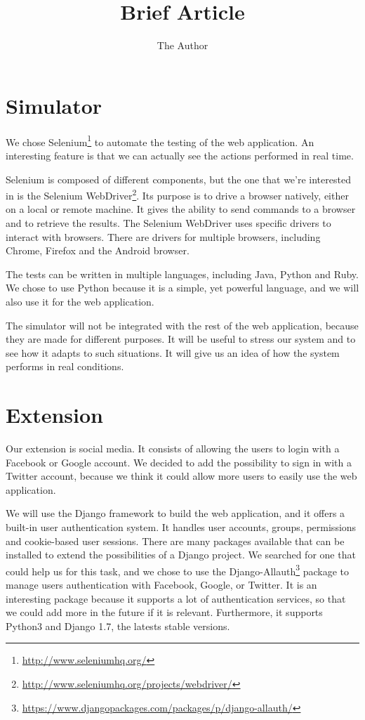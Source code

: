 \documentclass[11pt, a4paper]{article}   	%
\title{Brief Article}
\author{The Author}
\begin{document}

\section{Simulator}

We chose Selenium\footnote{\url{http://www.seleniumhq.org/}} to automate the testing of the web application.
An interesting feature is that we can actually see the actions performed in real time.

Selenium is composed of different components, but the one that we're interested in is the Selenium WebDriver\footnote{\url{http://www.seleniumhq.org/projects/webdriver/}}. %
Its purpose is to drive a browser natively, either on a local or remote machine.
It gives the ability to send commands to a browser and to retrieve the results.
The Selenium WebDriver uses specific drivers to interact with browsers.
There are drivers for multiple browsers, including Chrome, Firefox and the Android browser.

\medskip
The tests can be written in multiple languages, including Java, Python and Ruby.
We chose to use Python because it is a simple, yet powerful language, and we will also use it for the web application.

\medskip
The simulator will not be integrated with the rest of the web application, because they are made for different purposes.
It will be useful to stress our system and to see how it adapts to such situations.
It will give us an idea of how the system performs in real conditions.


\section{Extension}

Our extension is social media.
It consists of allowing the users to login with a Facebook or Google account.
We decided to add the possibility to sign in with a Twitter account, because we think it could allow more users to easily use the web application.

\medskip
We will use the Django framework to build the web application, and it offers a built-in user authentication system.
It handles user accounts, groups, permissions and cookie-based user sessions. 
There are many packages available that can be installed to extend the possibilities of a Django project.
We searched for one that could help us for this task, and we chose to use the Django-Allauth\footnote{\url{https://www.djangopackages.com/packages/p/django-allauth/}} package to manage users authentication with Facebook, Google, or Twitter.
It is an interesting package because it supports a lot of authentication services, so that we could add more in the future if it is relevant.
Furthermore, it supports Python3 and Django 1.7, the latests stable versions.
\end{document}
